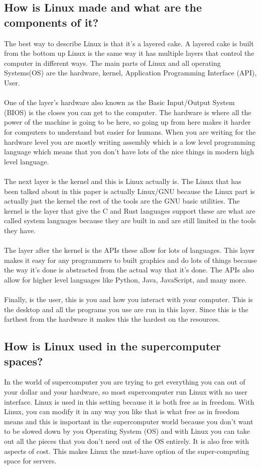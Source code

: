 \documentclass{article}
\begin{document}
\subsection{How is Linux made and what are the components of it?}
The best way to describe Linux is that it's a layered cake.
A layered cake is built from the bottom up Linux is the same way it has multiple layers that control the computer in different ways.
The main parts of Linux and all operating Systems(OS) are the hardware, kernel, Application Programming Interface (API), User.
\\ \\
One of the layer's hardware also known as the Basic Input/Output System (BIOS) is the closes you can get to the computer.
The hardware is where all the power of the machine is going to be here, so going up from here makes it harder for computers to understand but easier for humans.
When you are writing for the hardware level you are mostly writing assembly which is a low level programming language which means that you don't have lots of the nice things in modern high level language.
\\ \\
The next layer is the kernel and this is Linux actually is.
The Linux that has been talked about in this paper is actually Linux/GNU because the Linux part is actually just the kernel the rest of the tools are the GNU basic utilities.
The kernel is the layer that give the C and Rust languages support these are what are called system languages because they are built in and are still limited in the tools they have.
\\ \\
The layer after the kernel is the APIs these allow for lots of languages.
This layer makes it easy for any programmers to built graphics and do lots of things because the way it's done is abstracted from the actual way that it's done.
The APIs also allow for higher level languages like Python, Java, JavaScript, and many more.
\\ \\
Finally, is the user, this is you and how you interact with your computer.
This is the desktop and all the programs you use are run in this layer.
Since this is the farthest from the hardware it makes this the hardest on the resources.
\subsection{How is Linux used in the supercomputer spaces?}
In the world of supercomputer you are trying to get everything you can out of your dollar and your hardware, so most supercomputer run Linux with no user interface.
Linux is used in this setting because it is both free as in freedom.
With Linux, you can modify it in any way you like that is what free as in freedom means and this is important in the supercomputer world because you don't want to be slowed down by you Operating System (OS) and with Linux you can take out all the pieces that you don't need out of the OS entirely.
It is also free with aspects of cost.
This makes Linux the must-have option of the super-computing space for servers.
\end{document}
